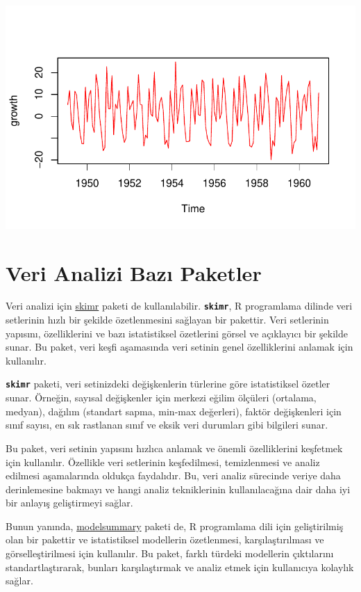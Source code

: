 \documentclass[
  letterpaper,
  DIV=11,
  numbers=noendperiod]{scrreprt}
\begin{document}
\includegraphics{data_analysis_files/figure-pdf/unnamed-chunk-5-8.pdf}

\section*{Veri Analizi Bazı
Paketler}\label{veri-analizi-bazux131-paketler}


Veri analizi için
\href{https://cran.r-project.org/web/packages/skimr/vignettes/skimr.html}{skimr}
paketi de kullanılabilir. \textbf{\texttt{skimr}}, R programlama dilinde
veri setlerinin hızlı bir şekilde özetlenmesini sağlayan bir pakettir.
Veri setlerinin yapısını, özelliklerini ve bazı istatistiksel özetlerini
görsel ve açıklayıcı bir şekilde sunar. Bu paket, veri keşfi aşamasında
veri setinin genel özelliklerini anlamak için kullanılır.

\textbf{\texttt{skimr}} paketi, veri setinizdeki değişkenlerin türlerine
göre istatistiksel özetler sunar. Örneğin, sayısal değişkenler için
merkezi eğilim ölçüleri (ortalama, medyan), dağılım (standart sapma,
min-max değerleri), faktör değişkenleri için sınıf sayısı, en sık
rastlanan sınıf ve eksik veri durumları gibi bilgileri sunar.

Bu paket, veri setinin yapısını hızlıca anlamak ve önemli özelliklerini
keşfetmek için kullanılır. Özellikle veri setlerinin keşfedilmesi,
temizlenmesi ve analiz edilmesi aşamalarında oldukça faydalıdır. Bu,
veri analiz sürecinde veriye daha derinlemesine bakmayı ve hangi analiz
tekniklerinin kullanılacağına dair daha iyi bir anlayış geliştirmeyi
sağlar.

Bunun yanında, \href{https://modelsummary.com/}{modelsummary} paketi de,
R programlama dili için geliştirilmiş olan bir pakettir ve istatistiksel
modellerin özetlenmesi, karşılaştırılması ve görselleştirilmesi için
kullanılır. Bu paket, farklı türdeki modellerin çıktılarını
standartlaştırarak, bunları karşılaştırmak ve analiz etmek için
kullanıcıya kolaylık sağlar.
\end{document}
